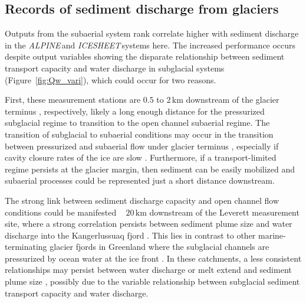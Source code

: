 \documentclass[11pt]{article}
\newcommand{\alpine}{\textit{ALPINE}\,}
\newcommand{\icesheet}{\textit{ICESHEET}\,}
\newcommand{\unit}[1]{$\mathrm{#1}$}
\begin{document}


\subsection{Records of sediment discharge  from glaciers}

Outputs from the subaerial system rank correlate higher with sediment discharge in the \alpine and \icesheet systems here.
The increased performance occurs despite  output variables showing the disparate relationship between sediment transport capacity and water discharge in subglacial systems (Figure~\ref{fig:Qw_vari}), which could occur for two reasons.

First, these measurement stations are $0.5$ to $2$\,\unit{km} downstream of the glacier terminus \citep{cowton2012,felix2022}, respectively, likely a long enough distance for the pressurized subglacial regime to transition to the open channel subaerial regime.
The transition of subglacial to subaerial conditions may occur in the transition between pressurized and subaerial flow under glacier terminus \citep{perolo2018}, especially if cavity closure rates of the ice are slow  \citep{egli2021b}.
Furthermore,  if a transport-limited regime persists at the glacier margin, then sediment can be easily mobilized and subaerial processes could be represented just a short distance downstream.

The strong link between sediment discharge capacity and open channel flow conditions could be manifested ~ $20$\,\unit{km} downstream of the Leverett measurement site, where a strong correlation persists between sediment plume size and water discharge into the Kangerlussuaq fjord \citep{mcgrath2010}.
This lies in contrast to other marine-terminating glacier fjords in Greenland where the subglacial channels are pressurized by ocean water at the ice front \citep[e.g.][]{how2017}. 
In these catchments, a less consistent relationships may persist between water discharge or melt extend and sediment plume size \citep{tedstone2012}, possibly due to the variable relationship between subglacial sediment transport capacity and water discharge.
\end{document}
